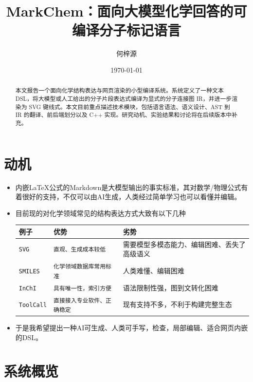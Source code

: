\documentclass[UTF8,a4paper,11pt]{ctexart}
\title{MarkChem：面向大模型化学回答的可编译分子标记语言}
\author{何梓源}
\date{\today}
\begin{document}
\maketitle

\begin{abstract}
本文报告一个面向化学结构表达与网页渲染的小型编译系统。系统定义了一种文本 DSL，将大模型或人工给出的分子片段表达式编译为显式的分子连接图 IR，并进一步渲染为 SVG 键线式。本文目前重点描述技术模块，包括语言语法、语义设计、AST 到 IR 的翻译、前后端划分以及 C++ 实现。研究动机、实验结果和讨论将在后续版本中补充。
\end{abstract}

\section{动机}

\begin{itemize}[leftmargin=2em]
  \item 内嵌LaTeX公式的Markdown是大模型输出的事实标准，其对数学/物理公式有着很好的支持，不仅可以由AI生成，人类经过简单学习也可以看懂并编辑。
  \item 目前现的对化学领域常见的结构表达方式大致有以下几种
        \begin{table}[h]
        \centering
        \begin{tabular}{lll}
        \toprule
        例子 & 优势 & 劣势 \\
        \midrule
        \verb|SVG| & \verb|直观、生成成本较低| & 需要模型多模态能力、编辑困难、丢失了高级语义 \\
        \verb|SMILES| & \verb|化学领域数据库常用标准| & 人类难懂、编辑困难 \\
        \verb|InChI| & \verb|具有唯一性，索引方便| & 语法限制性强，图到文转化困难 \\
        \verb|ToolCall| & \verb|直接接入专业软件、正确稳定| &  现有支持不多，不利于构建完整生态\\
        \bottomrule
        \end{tabular}
        \end{table}
  
  \item 于是我希望提出一种AI可生成、人类可手写，检查，局部编辑、适合网页内嵌的DSL。
\end{itemize}

\section{系统概览}
\end{document}
